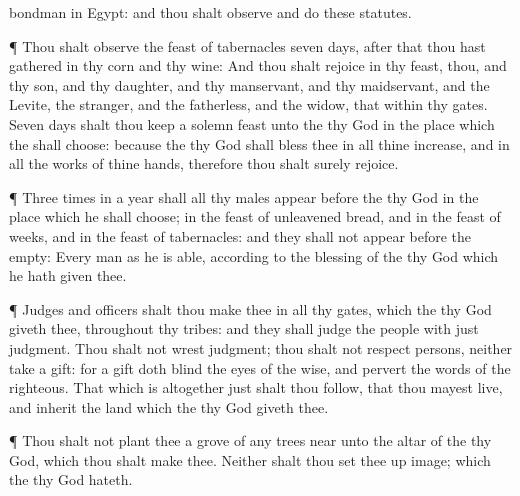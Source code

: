 {bondman in
Egypt: and thou shalt
observe and
do these
statutes.
\par }{\PP {}¶ Thou shalt
observe the
feast of
tabernacles
seven
days, after that thou hast
gathered in thy
corn and thy
wine:
And thou shalt
rejoice in thy
feast, thou, and thy
son, and thy
daughter, and thy
manservant, and thy
maidservant, and the
Levite, the
stranger, and the
fatherless, and the
widow, that
{} within thy
gates.
Seven
days shalt thou keep a solemn
feast unto the
{} thy
God in the
place which the
{} shall
choose: because the
{} thy
God shall
bless thee in all thine
increase, and in all the
works of thine
hands, therefore thou shalt surely
rejoice.
\par }{\PP {}¶
Three
times in a
year shall all thy
males
appear
before the
{} thy
God in the
place which he shall
choose; in the
feast of unleavened
bread, and in the
feast of
weeks, and in the
feast of
tabernacles: and they shall not
appear
before the
{}
empty:
Every
man
{} as he is
able, according to the
blessing of the
{} thy
God which he hath
given thee.
\par }{\PP {}¶
Judges and
officers shalt thou
make thee in all thy
gates, which the
{} thy
God
giveth thee, throughout thy
tribes: and they shall
judge the
people with
just
judgment.
Thou shalt not
wrest
judgment; thou shalt not
respect
persons, neither
take a
gift: for a
gift doth
blind the
eyes of the
wise, and
pervert the
words of the
righteous.
That which is
altogether
just shalt thou
follow, that thou mayest
live, and
inherit the
land which the
{} thy
God
giveth thee.
\par }{\PP {}¶ Thou shalt not
plant thee a
grove of any
trees near
unto the
altar of the
{} thy
God, which thou shalt
make thee.
Neither shalt thou set thee
up
{}
image; which the
{} thy
God
hateth.

}
